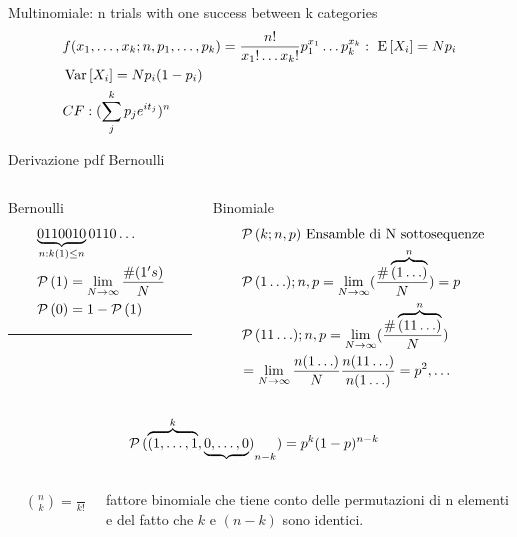 \begin{frame}{Multinomiale: n trials with one success between k categories}
	\begin{align*}
	&f(x_1,\ldots,x_k;n,p_1,\ldots,p_k)=\frac{n!}{x_1!\ldots x_k!}p_1^{x_1}\ldots p_k^{x_k}:\ \operatorname{E}{[X_i]}=Np_i\\
	&\operatorname{Var}{[X_i]}=Np_i(1-p_i)\\
	&CF: (\sum_j^kp_je^{it_j})^n
	\end{align*}
\end{frame}

\begin{wordonframe}{Derivazione pdf Bernoulli}
\begin{columns}[T]
\begin{column}{0.3\textwidth}
\begin{block}{Bernoulli}
\begin{align*}
&\underbrace{0110010}_{n:k(1)\leq n}0110\ldots\\
&\operatorname{\mathcal{P}}{(1)}=\lim_{N\to\infty}\frac{\#(1's)}{N}\\
&\operatorname{\mathcal{P}}{(0)}=1-\operatorname{\mathcal{P}}{(1)}\\
\end{align*}
\noindent\rule{0.9\textwidth}{0.4pt}
\end{block}
\end{column}
\begin{column}{0.7\textwidth}
\begin{block}{Binomiale}
\begin{align*}
&\operatorname{\mathcal{P}}{(k;n,p)}\ \text{Ensamble di N sottosequenze}\\
&\operatorname{\mathcal{P}}{(1\ldots);n,p}=\lim_{N\to\infty}(\frac{\#\overbrace{(1\ldots)}^n}{N})=p\\
&\operatorname{\mathcal{P}}{(11\ldots);n,p}=\lim_{N\to\infty}(\frac{\#\overbrace{(11\ldots)}^n}{N})\\
&=\lim_{N\to\infty}\frac{n(1\ldots)}{N}\frac{n(11\ldots)}{n(1\ldots)}=p^2, \ldots
\end{align*}
\end{block}
\end{column}
\end{columns}
\begin{align*}
&\operatorname{\mathcal{P}}{(\overbrace{(1,\ldots,1}^k,\underbrace{0,\ldots,0})}_{n-k})=p^k(1-p)^{n-k}
\end{align*}
\begin{columns}[T]
\begin{column}{0.2\textwidth}
\begin{align*}
&\binom{n}{k}=\frac{n!}{k!(n-k)!}
\end{align*}
\end{column}
\begin{column}{0.8\textwidth}
fattore binomiale che tiene conto delle permutazioni di n elementi e del fatto che $k$ e $(n-k)$ sono identici.
\end{column}
\end{columns}
\end{wordonframe}

